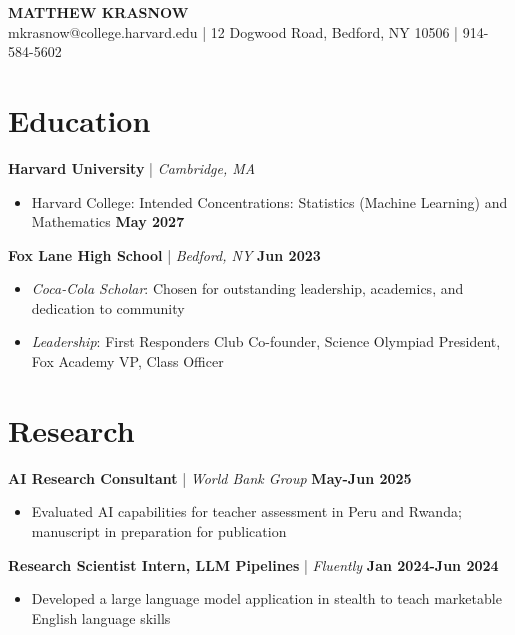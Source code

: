 \documentclass[letterpaper,10.5pt]{article}
\begin{document}
\begin{center}
  {\LARGE\bfseries{MATTHEW KRASNOW}}\\
  \vspace{0pt}
  mkrasnow@college.harvard.edu | 12 Dogwood Road, Bedford, NY 10506 | 914-584-5602
\end{center}

\section{Education}

\noindent\textbf{Harvard University} | \textit{Cambridge, MA}
\begin{itemize}
  \item Harvard College: Intended Concentrations: Statistics (Machine Learning) and Mathematics \hfill \textbf{May 2027}
\end{itemize}

\noindent\textbf{Fox Lane High School} | \textit{Bedford, NY} \hfill \textbf{Jun 2023}
\begin{itemize}
  \item \textit{Coca-Cola Scholar}: Chosen for outstanding leadership, academics, and dedication to community
  \item \textit{Leadership}: First Responders Club Co-founder, Science Olympiad President, Fox Academy VP, Class Officer
\end{itemize}

\section{Research}

\noindent\textbf{AI Research Consultant} | \textit{World Bank Group} \hfill \textbf{May-Jun 2025}
\begin{itemize}
  \item Evaluated AI capabilities for teacher assessment in Peru and Rwanda; manuscript in preparation for publication
\end{itemize}

\noindent\textbf{Research Scientist Intern, LLM Pipelines} | \textit{Fluently} \hfill \textbf{Jan 2024-Jun 2024}
\begin{itemize}
  \item Developed a large language model application in stealth to teach marketable English language skills
\end{itemize}
\end{document}
